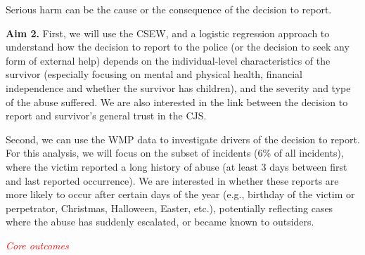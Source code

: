 \documentclass[11pt, a4paper]{article}
\begin{document}
Serious harm can be the cause or the consequence of the decision to report.


\textbf{Aim 2.} First, we will use the CSEW, and a logistic regression approach to understand how the decision to report to the police (or the decision to seek any form of external help) depends on the individual-level characteristics of the survivor (especially focusing on mental and physical health, financial independence and whether the survivor has children), and the severity and type of the abuse suffered. We are also interested in the link between the decision to report and survivor's general trust in the CJS.

Second, we can use the WMP data to investigate drivers of the decision to report. For this analysis, we will focus on the subset of incidents (6\% of all incidents), where the victim reported a long history of abuse (at least 3 days between first and last reported occurrence). We are interested in whether these reports are more likely to occur after certain days of the year (e.g., birthday of the victim or perpetrator, Christmas, Halloween, Easter, etc.), potentially reflecting cases where the abuse has suddenly escalated, or became known to outsiders.



\textcolor{red}{\textit{Core outcomes}}





\end{document}
